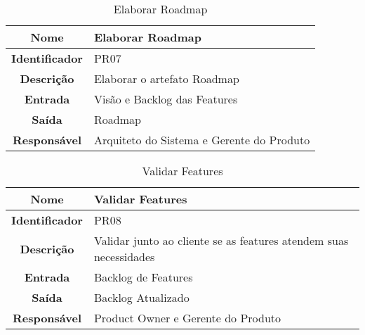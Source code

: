 {              \begin{table}[H]
                \centering
                \caption{Elaborar Roadmap}
                \begin{tabular}{c|p{10cm}}
                    \hline
                    \textbf{Nome}            & Elaborar Roadmap\\
                    \hline
                    \textbf{Identificador} & PR07\\ 
                    \hline
                    \textbf{Descrição}   & Elaborar o artefato Roadmap\\ 
                    \hline
                    \textbf{Entrada}           & Visão e Backlog das Features\\
                    \hline
                    \textbf{Saída}            &  Roadmap\\
                    \hline
                    \textbf{Responsável}            & Arquiteto do Sistema e Gerente do Produto\\
                    \hline                    
                \end{tabular}
            \end{table}

              \begin{table}[H]
                \centering
                \caption{Validar Features}
                \begin{tabular}{c|p{10cm}}
                    \hline
                    \textbf{Nome}            & Validar Features\\
                    \hline
                    \textbf{Identificador} & PR08\\ 
                    \hline
                    \textbf{Descrição}   & Validar junto ao cliente se as features atendem suas necessidades\\ 
                    \hline
                    \textbf{Entrada}           & Backlog de Features\\
                    \hline
                    \textbf{Saída}            &  Backlog Atualizado\\
                    \hline
                    \textbf{Responsável}            & Product Owner e  Gerente do Produto\\
                    \hline                    
                \end{tabular}
            \end{table}

}
